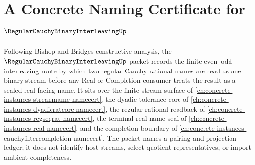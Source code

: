 \chapter{A Concrete Naming Certificate for $\RegularCauchyBinaryInterleavingUp$}
\label{ch:concrete-instances-regular-cauchy-binary-interleaving-namecert}

Following Bishop and Bridges constructive analysis, the $\RegularCauchyBinaryInterleavingUp$ packet records the finite even--odd interleaving route by which two regular Cauchy rational names are read as one binary stream before any Real or Completion consumer treats the result as a sealed real-facing name. It sits over the finite stream surface of \autoref{ch:concrete-instances-streamname-namecert}, the dyadic tolerance core of \autoref{ch:concrete-instances-dyadicratcore-namecert}, the regular rational readback of \autoref{ch:concrete-instances-regseqrat-namecert}, the terminal real-name seal of \autoref{ch:concrete-instances-real-namecert}, and the completion boundary of \autoref{ch:concrete-instances-cauchyfiltercompletion-namecert}. The packet names a pairing-and-projection ledger; it does not identify host streams, select quotient representatives, or import ambient completeness.

